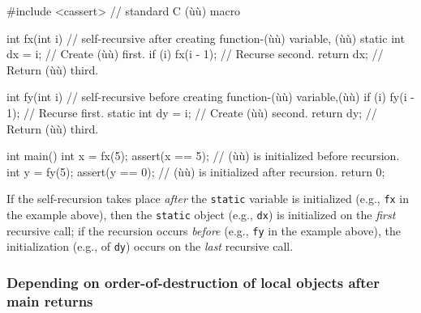 \begin{emcppshiddenlisting}[emcppsbatch=e2]
#include <cassert>  // standard C (ù{}ù) macro
\end{emcppshiddenlisting}
\begin{emcppslisting}[emcppsbatch=e2]
int fx(int i)  // self-recursive after creating function-(ù{}ù) variable, (ù{}ù)
{
    static int dx = i;     // Create (ù{}ù) first.
    if (i) { fx(i - 1); }  // Recurse second.
    return dx;             // Return (ù{}ù) third.
}

int fy(int i)  // self-recursive before creating function-(ù{}ù) variable,(ù{}ù)
{
    if (i) { fy(i - 1); }  // Recurse first.
    static int dy = i;     // Create (ù{}ù) second.
    return dy;             // Return (ù{}ù) third.
}

int main()
{
    int x = fx(5);  assert(x == 5);  // (ù{}ù) is initialized before recursion.
    int y = fy(5);  assert(y == 0);  // (ù{}ù) is initialized after recursion.
    return 0;
}
\end{emcppslisting}

\noindent If the self-recursion takes place \emph{after} the \lstinline!static!
variable is initialized (e.g., \lstinline!fx! in the example above), then the
\lstinline!static! object (e.g., \lstinline!dx!) is initialized on the
\emph{first} recursive call; if the recursion occurs \emph{before}
(e.g., \lstinline!fy! in the example above), the initialization (e.g., of \lstinline!dy!)
occurs on the \emph{last} recursive call.


\subsubsection[Depending on order-of-destruction of local objects after {\tt main} returns]{Depending on order-of-destruction of local objects after {\SubsubsecCode main} returns}\label{depending-on-order-of-destruction-of-local-objects-after-main-returns}


